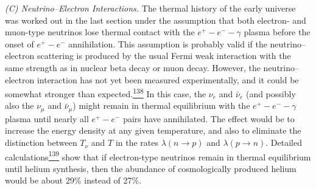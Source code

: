 \emph{(C) Neutrino--Electron Interactions.} The thermal history of the early
universe was worked out in the last section under the assumption that both
electron- and muon-type neutrinos lose thermal contact with the
\(e^+-e^--\gamma\) plasma before the onset of \(e^+-e^-\) annihilation.
This assumption is probably valid if the neutrino--electron scattering is
produced by the usual Fermi weak interaction with the same strength as in
nuclear beta decay or muon decay. However, the neutrino--electron interaction
has not yet been measured experimentally, and it could be somewhat stronger
than expected.\hyperref[ch15-ref-138]{\textsuperscript{138}} In this case,
the \(\nu_e\) and \(\bar\nu_e\) (and possibly also the \(\nu_\mu\) and
\(\bar\nu_\mu\)) might remain in thermal equilibrium with the
\(e^+-e^--\gamma\) plasma until nearly all \(e^+-e^-\) pairs have
annihilated. The effect would be to increase the energy density at any given
temperature, and also to eliminate the distinction between \(T_\nu\) and
\(T\) in the rates \(\lambda(n\to p)\) and \(\lambda(p\to n)\). Detailed
calculations\hyperref[ch15-ref-139]{\textsuperscript{139}} show that if
electron-type neutrinos remain in thermal equilibrium until helium synthesis,
then the abundance of cosmologically produced helium would be about 29\%
instead of 27\%.

